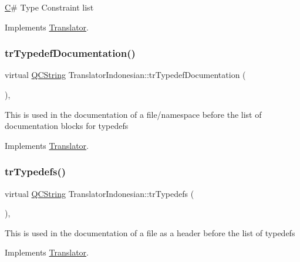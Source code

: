 \mbox{\hyperlink{class_c}{C}}\# Type Constraint list 

Implements \mbox{\hyperlink{class_translator}{Translator}}.

\mbox{\label{class_translator_indonesian_a6da892ce3bbe7a559d21fb633ce2c1ab}} 
\subsubsection{\texorpdfstring{trTypedefDocumentation()}{trTypedefDocumentation()}}
{\footnotesize\ttfamily virtual \mbox{\hyperlink{class_q_c_string}{Q\+C\+String}} Translator\+Indonesian\+::tr\+Typedef\+Documentation (\begin{DoxyParamCaption}{ }\end{DoxyParamCaption})\hspace{0.3cm}{\ttfamily [inline]}, {\ttfamily [virtual]}}

This is used in the documentation of a file/namespace before the list of documentation blocks for typedefs 

Implements \mbox{\hyperlink{class_translator}{Translator}}.

\mbox{\label{class_translator_indonesian_a21eeaa566986fb159bc8b3ceb1718398}} 
\subsubsection{\texorpdfstring{trTypedefs()}{trTypedefs()}}
{\footnotesize\ttfamily virtual \mbox{\hyperlink{class_q_c_string}{Q\+C\+String}} Translator\+Indonesian\+::tr\+Typedefs (\begin{DoxyParamCaption}{ }\end{DoxyParamCaption})\hspace{0.3cm}{\ttfamily [inline]}, {\ttfamily [virtual]}}

This is used in the documentation of a file as a header before the list of typedefs 

Implements \mbox{\hyperlink{class_translator}{Translator}}.

\mbox{\label{class_translator_indonesian_a7ce5f320693eb175d7ad73e65e4eb878}} 
